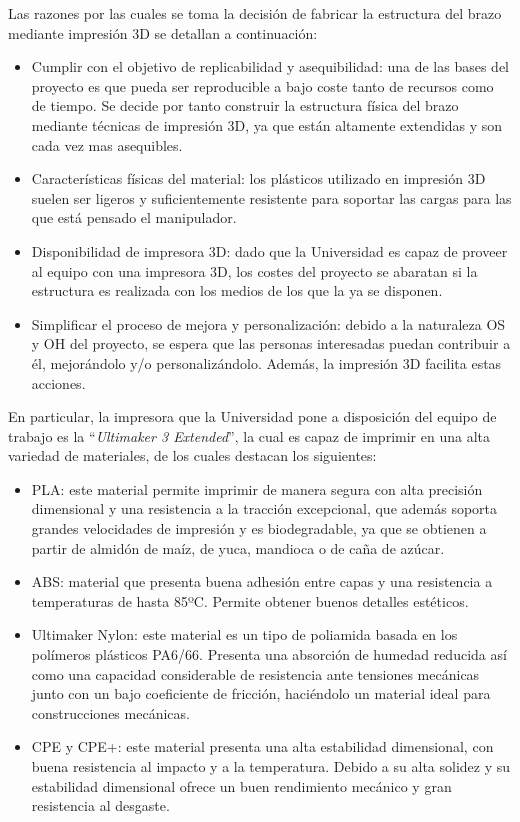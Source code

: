 Las razones por las cuales se toma la decisión de fabricar la estructura del brazo mediante impresión 3D se detallan a continuación:

\begin{itemize}
  \item Cumplir con el objetivo de replicabilidad y asequibilidad: una de las bases del proyecto es que pueda ser reproducible a bajo coste tanto de recursos como de tiempo. Se decide por tanto construir la estructura física del brazo mediante técnicas de impresión 3D, ya que están altamente extendidas y son cada vez mas asequibles.
  
  \item Características físicas del material: los plásticos utilizado en impresión 3D suelen ser ligeros y suficientemente resistente para soportar las cargas para las que está pensado el manipulador.
  
  \item Disponibilidad de impresora 3D: dado que la Universidad es capaz de proveer al equipo con una impresora 3D, los costes del proyecto se abaratan si la estructura es realizada con los medios de los que la ya se disponen.
  
  \item Simplificar el proceso de mejora y personalización: debido a la naturaleza \ac{OS} y \ac{OH} del proyecto, se espera que las personas interesadas puedan contribuir a él, mejorándolo y/o personalizándolo. Además, la impresión 3D facilita estas acciones.
\end{itemize}

En particular, la impresora que la Universidad pone a disposición del equipo de trabajo es la ``\textit{Ultimaker 3 Extended}'', la cual es capaz de imprimir en una alta variedad de materiales, de los cuales destacan los siguientes:

\begin{itemize}
    \item \ac{PLA}\cite{AcidoPolilactico2020}: este material permite imprimir de manera segura con alta precisión dimensional y una resistencia a la tracción excepcional, que además soporta grandes velocidades de impresión y es biodegradable, ya que se obtienen a partir de almidón de maíz, de yuca, mandioca o de caña de azúcar. 
    \item \ac{ABS}\cite{AcrilonitriloButadienoEstireno2020}: material que presenta buena adhesión entre capas y una resistencia a temperaturas de hasta 85ºC. Permite obtener buenos detalles estéticos.
    \item Ultimaker Nylon: este material es un tipo de poliamida basada en los polímeros plásticos PA6/66. Presenta una absorción de humedad reducida así como una capacidad considerable de resistencia ante tensiones mecánicas junto con un bajo coeficiente de fricción, haciéndolo un material ideal para construcciones mecánicas.
    \item CPE y CPE+: este material presenta una alta estabilidad dimensional, con buena resistencia al impacto y a la temperatura. Debido a su alta solidez y su estabilidad dimensional ofrece un buen rendimiento mecánico y gran resistencia al desgaste.
\end{itemize}

